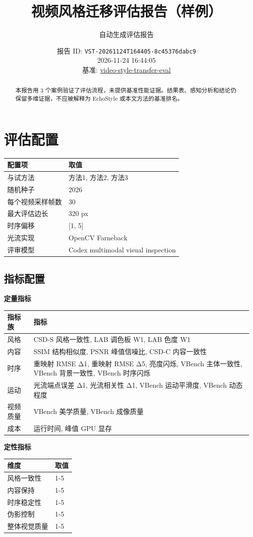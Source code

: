 \documentclass[UTF8,10pt]{ctexart}
\begin{document}
\title{视频风格迁移评估报告（样例）}
\author{自动生成评估报告}
\date{报告 ID: \texttt{VST-20261124T164405-8c45376dabc9} \\ 2026-11-24 16:44:05 \\ 基准: \href{https://github.com/0x0addc001/video-style-transfer-eval}{video-style-transfer-eval}}
\maketitle
\begin{abstract}
本报告用 3 个案例验证了评估流程，未提供基准性能证据。结果表、感知分析和结论仍保留多维证据，不应被解释为 EchoStyle 或本文方法的基准排名。
\end{abstract}
\section*{评估配置}
\begin{tabular}{@{}ll@{}}
\toprule
配置项 & 取值 \\
\midrule
与试方法 & 方法1, 方法2, 方法3 \\
随机种子 & 2026 \\
每个视频采样帧数 & 30 \\
最大评估边长 & 320 px \\
时序偏移 & [1, 5] \\
光流实现 & OpenCV Farneback \\
评审模型 & Codex multimodal visual inspection \\
\bottomrule
\end{tabular}
\subsection*{指标配置}
\noindent\textbf{定量指标}
\begin{tabular}{@{}ll@{}}
\toprule
指标族 & 指标 \\
\midrule
风格 & CSD-S 风格一致性, LAB 调色板 W1, LAB 色度 W1 \\
内容 & SSIM 结构相似度, PSNR 峰值信噪比, CSD-C 内容一致性 \\
时序 & 重映射 RMSE Δ1, 重映射 RMSE Δ5, 亮度闪烁, VBench 主体一致性, VBench 背景一致性, VBench 时序闪烁 \\
运动 & 光流端点误差 Δ1, 光流相关性 Δ1, VBench 运动平滑度, VBench 动态程度 \\
视频质量 & VBench 美学质量, VBench 成像质量 \\
成本 & 运行时间, 峰值 GPU 显存 \\
\bottomrule
\end{tabular}
\noindent\textbf{定性指标}
\begin{tabular}{@{}ll@{}}
\toprule
维度 & 取值 \\
\midrule
风格一致性 & 1-5 \\
内容保持 & 1-5 \\
时序稳定性 & 1-5 \\
伪影控制 & 1-5 \\
整体视觉质量 & 1-5 \\
\bottomrule
\end{tabular}
\end{document}
